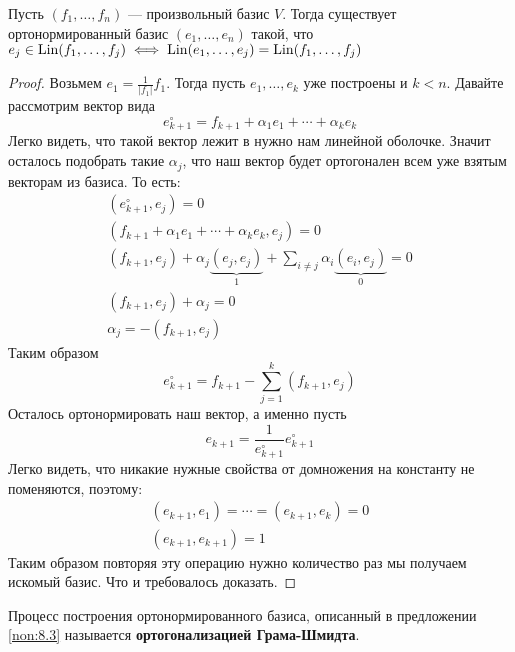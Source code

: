 \documentclass[../main.tex]{subfiles}
\begin{document}
\begin{theorem-non}
\label{non:8.3}
  Пусть $(f_1, \dotsc, f_n)$ --- произвольный базис $V$. Тогда существует ортонормированный базис $(e_1, \dotsc, e_n)$ такой, что $e_j \in \operatorname{Lin}(f_1, \dotsc, f_j) \iff \operatorname{Lin}(e_1, \dotsc, e_j) = \operatorname{Lin}(f_1, \dotsc, f_j)$
\end{theorem-non}
\begin{proof}
  Возьмем $e_1 = \frac{1}{|f_1|} f_1$. Тогда пусть $e_1, \dotsc, e_k$ уже построены и $k < n$. Давайте рассмотрим вектор вида
  \begin{equation*}
    e_{k + 1}^{\circ} = f_{k + 1} + \alpha_1 e_1 + \dotsb + \alpha_k e_k
  \end{equation*}
  Легко видеть, что такой вектор лежит в нужно нам линейной оболочке. Значит осталось подобрать такие $\alpha_j$, что наш вектор будет ортогонален всем уже взятым векторам из базиса. То есть:
  \begin{equation*}
    \begin{gathered}
      (e_{k + 1}^{\circ}, e_j) = 0 \\
      (f_{k + 1} + \alpha_1 e_1 + \dotsb + \alpha_k e_k, e_j) = 0 \\
      (f_{k + 1}, e_j) + \alpha_j \underbrace{(e_j, e_j)}_{1} + \sum\limits_{i \neq j} \alpha_i \underbrace{(e_i, e_j)}_{0} = 0\\
      (f_{k + 1}, e_j) + \alpha_j = 0 \\
      \alpha_j = -(f_{k + 1}, e_j)
    \end{gathered}
  \end{equation*}
  Таким образом
  \begin{equation*}
    e_{k + 1}^{\circ} = f_{k + 1} - \sum\limits_{j = 1}^{k} (f_{k + 1}, e_j)
  \end{equation*}
  Осталось ортонормировать наш вектор, а именно пусть
  \begin{equation*}
    e_{k + 1} = \frac{1}{e_{k + 1}^{\circ}} e_{k + 1}^{\circ}
  \end{equation*}
  Легко видеть, что никакие нужные свойства от домножения на константу не поменяются, поэтому:
  \begin{equation*}
    \begin{gathered}
      (e_{k + 1}, e_1) = \dotsb = (e_{k + 1}, e_k) = 0 \\
      (e_{k + 1}, e_{k + 1}) = 1
    \end{gathered}
  \end{equation*}
  Таким образом повторяя эту операцию нужно количество раз мы получаем искомый базис. Что и требовалось доказать.
\end{proof}

\begin{remark}
  Процесс построения ортонормированного базиса, описанный в предложении \ref{non:8.3} называется \textbf{ортогонализацией Грама-Шмидта}.
\end{remark}
\end{document}
